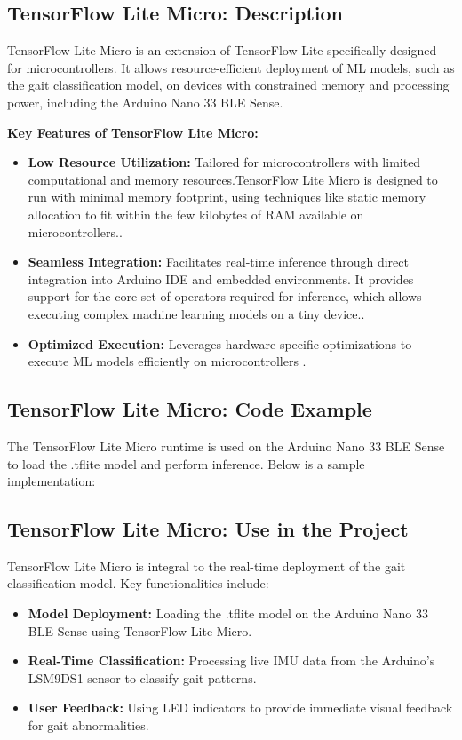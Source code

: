 \subsection{TensorFlow Lite Micro: Description}
TensorFlow Lite Micro is an extension of TensorFlow Lite specifically designed for microcontrollers. It allows resource-efficient deployment of ML models, such as the gait classification model, on devices with constrained memory and processing power, including the Arduino Nano 33 BLE Sense. 

\textbf{Key Features of TensorFlow Lite Micro:}
\begin{itemize}
    \item \textbf{Low Resource Utilization:} Tailored for microcontrollers with limited computational and memory resources.TensorFlow Lite Micro is designed to run with minimal memory footprint, using techniques like static memory allocation to fit within the few kilobytes of RAM available on microcontrollers.\cite{GoogleLiteRT:2023}.
    \item \textbf{Seamless Integration:} Facilitates real-time inference through direct integration into Arduino IDE and embedded environments. It provides support for the core set of operators required for inference, which allows executing complex machine learning models on a tiny device.\cite{GoogleLiteRT:2023}.
    \item \textbf{Optimized Execution:} Leverages hardware-specific optimizations to execute ML models efficiently on microcontrollers \cite{GoogleLiteRT:2023}.
\end{itemize}

\subsection{TensorFlow Lite Micro: Code Example}
The TensorFlow Lite Micro runtime is used on the Arduino Nano 33 BLE Sense to load the .tflite model and perform inference. Below is a sample implementation:



\lstset{style=pythonstyle}


\subsection{TensorFlow Lite Micro: Use in the Project}
TensorFlow Lite Micro is integral to the real-time deployment of the gait classification model. Key functionalities include:
\begin{itemize}
    \item \textbf{Model Deployment:} Loading the .tflite model on the Arduino Nano 33 BLE Sense using TensorFlow Lite Micro\cite{GoogleLiteRT:2023}.
    \item \textbf{Real-Time Classification:} Processing live IMU data from the Arduino's LSM9DS1 sensor to classify gait patterns.
    \item \textbf{User Feedback:} Using LED indicators to provide immediate visual feedback for gait abnormalities.
\end{itemize}
\


